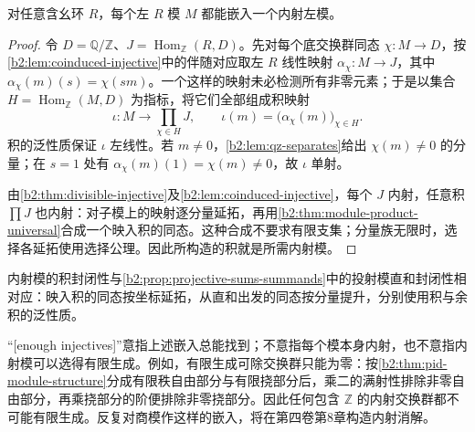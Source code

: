 \begin{theorem}[足够多内射对象]\label{b2:thm:enough-injectives}
	对任意含幺环 \(R\)，每个左 \(R\) 模 \(M\) 都能嵌入一个内射左模。
\end{theorem}
\begin{proof}
	令 \(D=\mathbb Q/\mathbb Z\)、\(J=\operatorname{Hom}_{\mathbb Z}(R,D)\)。先对每个底交换群同态 \(\chi:M\to D\)，按\cref{b2:lem:coinduced-injective}中的伴随对应取左 \(R\) 线性映射 \(\alpha_\chi:M\to J\)，其中 \(\alpha_\chi(m)(s)=\chi(sm)\)。一个这样的映射未必检测所有非零元素；于是以集合 \(H=\operatorname{Hom}_{\mathbb Z}(M,D)\) 为指标，将它们全部组成积映射
	\[
		\iota:M\longrightarrow\prod_{\chi\in H}J, \qquad \iota(m)=\bigl(\alpha_\chi(m)\bigr)_{\chi\in H}.
	\]
	积的泛性质保证 \(\iota\) 左线性。若 \(m\ne0\)，\cref{b2:lem:qz-separates}给出 \(\chi(m)\ne0\) 的分量；在 \(s=1\) 处有 \(\alpha_\chi(m)(1)=\chi(m)\ne0\)，故 \(\iota\) 单射。

	由\cref{b2:thm:divisible-injective}及\cref{b2:lem:coinduced-injective}，每个 \(J\) 内射，任意积 \(\prod J\) 也内射：对子模上的映射逐分量延拓，再用\cref{b2:thm:module-product-universal}合成一个映入积的同态。这种合成不要求有限支集；分量族无限时，选择各延拓使用选择公理。因此所构造的积就是所需内射模。
\end{proof}

内射模的积封闭性与\cref{b2:prop:projective-sums-summands}中的投射模直和封闭性相对应：映入积的同态按坐标延拓，从直和出发的同态按分量提升，分别使用积与余积的泛性质。

\ProseParagraphBreak
“[enough injectives]”意指上述嵌入总能找到；不意指每个模本身内射，也不意指内射模可以选得有限生成。例如，有限生成可除交换群只能为零：按\cref{b2:thm:pid-module-structure}分成有限秩自由部分与有限挠部分后，乘二的满射性排除非零自由部分，再乘挠部分的阶便排除非零挠部分。因此任何包含 \(\mathbb Z\) 的内射交换群都不可能有限生成。反复对商模作这样的嵌入，将在第四卷第8章构造内射消解。
